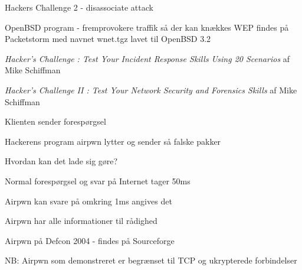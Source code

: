 \documentclass[20pt,landscape,a4paper,footrule]{foils}
\begin{document}
\begin{list1}
\item Hackers Challenge 2 - disassociate attack
\item OpenBSD program - fremprovokere traffik så der kan knækkes WEP
findes på Packetstorm med navnet wnet.tgz lavet til OpenBSD 3.2
\end{list1}

\begin{center}
\small \emph{Hacker's Challenge : Test Your Incident Response Skills
    Using 20 Scenarios} af Mike Schiffman

\emph{Hacker's Challenge II : Test Your Network Security and Forensics
  Skills} af Mike Schiffman
\end{center}










\begin{list1}
\item Klienten sender forespørgsel
\item Hackerens program airpwn lytter og sender så falske pakker
\item Hvordan kan det lade sig gøre?
\begin{list2}
\item Normal forespørgsel og svar på Internet tager 50ms
\item Airpwn kan svare på omkring 1ms angives det
\item Airpwn har alle informationer til rådighed
\end{list2}
\item Airpwn på Defcon 2004 - findes på Sourceforge\\
\item NB: Airpwn som demonstreret er begrænset til TCP og ukrypterede
  forbindelser
\end{list1}
\end{document}
